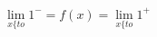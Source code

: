 \documentclass[preview]{standalone}
\begin{document}
\begin{align*}
{{\lim_{x\{to}1^-}=f(x)=\lim_{x\{to}1^+}
\end{align*}
\end{document}
